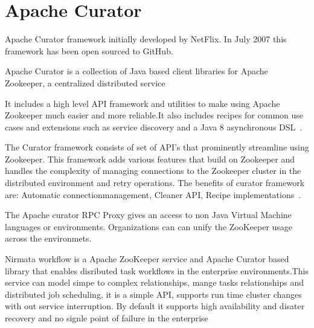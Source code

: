 \section{Apache Curator}

Apache Curator framework initially developed
by NetFlix. In July 2007 this framework has 
been open sourced to GitHub.

Apache Curator is a collection of Java 
based client libraries for
Apache Zookeeper, a centralized distributed
service~\cite{hid-sp18-514-apachecurator}

It includes a high level API framework and utilities 
to make using Apache Zookeeper much easier
and more reliable.It also includes recipes 
for common use cases and
extensions such as service discovery 
and a Java 8 asynchronous
DSL~\cite{hid-sp18-514-apachecurator}.  

The Curator framework consists of set of API's 
that prominently streamline using Zookeeper.  
This framework adds various 
features that build on Zookeeper and handles
the complexity of managing connections to the 
Zookeeper cluster in the distributed 
environment and retry operations.
The benefits of curator framework are:
Automatic connectionmanagement, 
Cleaner API, Recipe
implementations~\cite{hid-sp18-514-apachecuratorfeatures}.

The Apache curator RPC Proxy gives an access to
non Java Virtual Machine languages or environments.
Organizations can can unify the ZooKeeper usage across
the environmets.

Nirmata workflow is a Apache ZooKeeper service
and Apache Curator based library that enables
disributed task workflows in the enterprise
environments.This service can model simpe to 
complex relationships, mange tasks relationships
and distributed job scheduling, it is a simple API,
supports run time cluster changes with out service 
interruption. By default it supports high availability
and disater recovery and no signle point of failure in
the enterprise~\cite{hid-sp18-514-nirmataCurator}